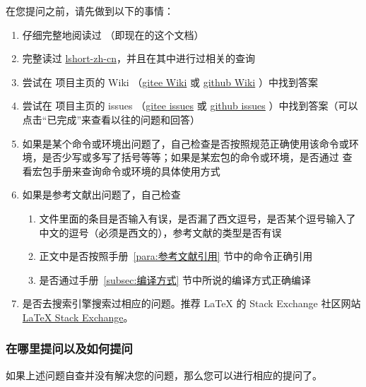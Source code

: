 在您提问之前，请先做到以下的事情：
\begin{enumerate}
  \item 仔细完整地阅读过  （即现在的这个文档）
  \item 完整读过 \href{https://ctan.math.illinois.edu/info/lshort/chinese/lshort-zh-cn.pdf}{lshort-zh-cn}，并且在其中进行过相关的查询
  \item 尝试在  项目主页的 Wiki （\href{https://gitee.com/xkwxdyy/CCNUthesis/wikis/Home}{gitee Wiki} 或 \href{https://github.com/xkwxdyy/CCNUthesis/wikis/Home}{github Wiki} ）中找到答案
  \item 尝试在  项目主页的 issues （\href{https://gitee.com/xkwxdyy/CCNUthesis/issues}{gitee issues} 或 \href{https://github.com/xkwxdyy/CCNUthesis/issues}{github issues} ）中找到答案（可以点击“已完成”来查看以往的问题和回答）
  \item 如果是某个命令或环境出问题了，自己检查是否按照规范正确使用该命令或环境，是否少写或多写了括号等等；如果是某宏包的命令或环境，是否通过   查看宏包手册来查询命令或环境的具体使用方式
  \item 如果是参考文献出问题了，自己检查
    \begin{enumerate}
      \item {} 文件里面的条目是否输入有误，是否漏了西文逗号，是否某个逗号输入了中文的逗号（必须是西文的），参考文献的类型是否有误
      \item 正文中是否按照手册~\ref{para:参考文献引用} 节中的命令正确引用
      \item 是否通过手册~\ref{subsec:编译方式} 节中所说的编译方式正确编译
    \end{enumerate}
  \item 是否去搜索引擎搜索过相应的问题。推荐 \LaTeX{} 的 Stack Exchange 社区网站 \href{https://tex.stackexchange.com/}{LaTeX Stack Exchange}。
\end{enumerate}


\subsubsection{在哪里提问以及如何提问}

如果上述问题自查并没有解决您的问题，那么您可以进行相应的提问了。

